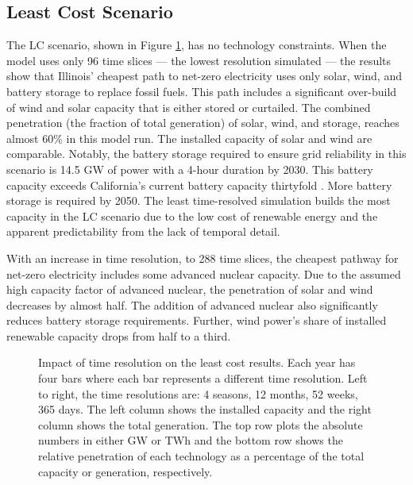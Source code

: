 \subsection{Least Cost Scenario}

The \gls{LC} scenario, shown in Figure \ref{fig:time_res_LC}, has no
technology constraints. When the model uses only 96 time slices --- the lowest
resolution simulated --- the results show that Illinois' cheapest path to net-zero
electricity uses
only solar, wind, and battery storage to replace fossil fuels. This path includes
a significant over-build of wind and solar capacity that is either stored
or curtailed. The combined penetration (the fraction of total generation)
of solar, wind, and storage, reaches almost 60\% in this model run. The installed
capacity of solar and wind are comparable. Notably, the battery storage
required to ensure grid reliability in this scenario is 14.5 GW of power with
a 4-hour duration by 2030. This battery capacity exceeds California's current
battery capacity thirtyfold \cite{hutchins_us_2021}. More battery storage is
required by 2050. The least time-resolved simulation builds the most capacity in
the \gls{LC} scenario due to the low cost of renewable energy and the apparent
predictability from the lack of temporal detail.

With an increase in time resolution, to 288 time slices, the cheapest pathway
for net-zero electricity includes some advanced nuclear capacity.
Due to the assumed high capacity factor of advanced nuclear, the penetration of
solar and wind decreases by almost half. The addition of advanced nuclear also significantly
reduces battery storage requirements. Further, wind power's share of installed renewable
capacity drops from half to a third.

\begin{figure}[H]
  \centering
  \resizebox{0.95\columnwidth}{!}{}
  \caption{Impact of time resolution on the least cost results. Each year has four bars where
  each bar represents a different time resolution. Left to right, the time resolutions are: 4
  seasons, 12 months, 52 weeks, 365 days.
  The left column shows the installed capacity and the right column shows the
  total generation. The top row plots the absolute numbers in either GW or TWh
  and the bottom row shows the relative penetration of each technology as a
  percentage of the total capacity or generation, respectively.}
  \label{fig:time_res_LC}
\end{figure}

